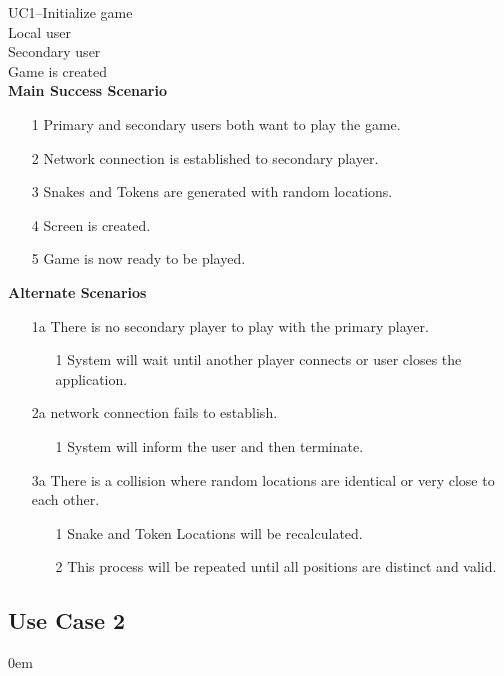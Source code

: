 \documentclass[titlepage]{article}
\begin{document}
			\textbf{} UC1--Initialize game\\
			\textbf{} Local user\\
			\textbf{} Secondary user\\
			\textbf{} Game is created\\
			\textbf{Main Success Scenario}
				\begin{enumerate}
					\itemsep0em 
					\item[1] Primary and secondary users both want to play the game.
					\item[2] Network connection is established to secondary player.
					\item[3] Snakes and Tokens are generated with random locations.
					\item[4] Screen is created.
					\item[5] Game is now ready to be played.
				\end{enumerate}
			\textbf{Alternate Scenarios}
			\begin{enumerate}
									\itemsep0em 
				\item[1a]There is no secondary player to play with the primary player.
				\begin{enumerate}
										\itemsep0em 
					\item[1]System will wait until another player connects or user closes the application.
				\end{enumerate}
				\item[2a]network connection fails to establish.
				\begin{enumerate}
										\itemsep0em 
					\item[1]System will inform the user and then terminate.
				\end{enumerate}
				\item[3a]There is a collision where random locations are identical or very close to each other.
				\begin{enumerate}
										\itemsep0em 
					\item[1]Snake and Token Locations will be recalculated.
					\item[2]This process will be repeated until all positions are distinct and valid.
				\end{enumerate}
			\end{enumerate}
		
	\subsection{Use Case 2}
	\itemsep0em 
	
\end{document}
